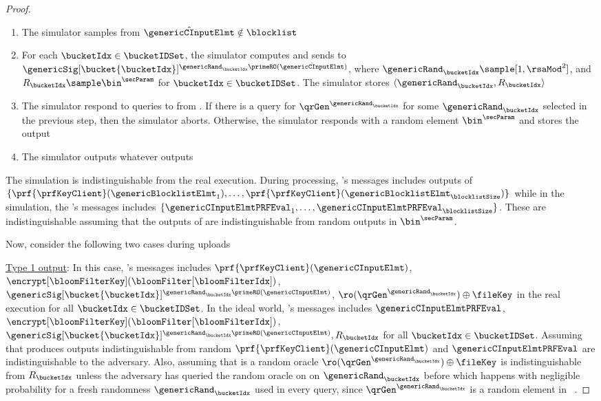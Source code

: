 \begin{proof}
\begin{itemize}
\begin{enumerate}[resume]
\begin{enumerate}
\item The simulator samples from $\hat{\genericCInputElmt} \notin \blocklist$
\item For each $\bucketIdx \in \bucketIDSet$, the simulator computes and sends to \server $\genericSig[\bucket{\bucketIdx}]^{\genericRand_\bucketIdx \primeRO(\hat{\genericCInputElmt})}$, where $\genericRand_\bucketIdx \sample [1, \rsaMod^2]$, and $R_\bucketIdx \sample \bin^{\secParam}$ for $\bucketIdx \in \bucketIDSet$.  The simulator stores $\langle \genericRand_\bucketIdx, R_\bucketIdx \rangle$
\item The simulator respond to queries to \ro from \server. If there is a query for $\qrGen^{\genericRand_\bucketIdx}$ for some $\genericRand_\bucketIdx$ selected in the previous step, then the simulator aborts. Otherwise, the simulator responds with a random element $\bin^{\secParam}$ and stores the output
\item The simulator outputs whatever \server outputs
\end{enumerate}
\end{enumerate}
\end{itemize}


The simulation is indistinguishable from the real execution. During processing, \server's messages includes outputs of \authOPRFFunc 
$\{ \prf{\prfKeyClient}(\genericBlocklistElmt_1), \dots,   \prf{\prfKeyClient}(\genericBlocklistElmt_\blocklistSize)\}$
while in the simulation, the \server's messages includes $\{ \genericCInputElmtPRFEval_1, \dots, \genericCInputElmtPRFEval_\blocklistSize \}$. These are indistinguishable assuming that the outputs of \prf are indistinguishable from random outputs in $\bin^{\secParam}$. 




Now, consider the following two cases during uploads


\noindent \underline{Type 1 output}: In this case, \server's messages includes $ \prf{\prfKeyClient}(\genericCInputElmt)$, $\encrypt[\bloomFilterKey](\bloomFilter[\bloomFilterIdx])$, $\genericSig[\bucket{\bucketIdx}]^{\genericRand_\bucketIdx \primeRO(\genericCInputElmt)}$, $\ro(\qrGen^{\genericRand_\bucketIdx}) \oplus \fileKey $ in the real execution for all $\bucketIdx \in \bucketIDSet$. In the ideal world, \server's messages includes $\genericCInputElmtPRFEval$, $\encrypt[\bloomFilterKey](\bloomFilter[\bloomFilterIdx])$, $\genericSig[\bucket{\bucketIdx}]^{\genericRand_\bucketIdx \primeRO(\genericCInputElmt)}, R_\bucketIdx$ for all $\bucketIdx \in \bucketIDSet$. Assuming that \prf produces outputs indistinguishable from random  $ \prf{\prfKeyClient}(\genericCInputElmt)$ and $\genericCInputElmtPRFEval$ are indistinguishable to the adversary. Also, assuming that \ro is a random oracle $\ro(\qrGen^{\genericRand_\bucketIdx}) \oplus \fileKey $ is indistinguishable from $R_\bucketIdx$ unless the adversary has queried the random oracle on \ro on $\genericRand_\bucketIdx$ before which happens with negligible probability for a fresh randomness $\genericRand_\bucketIdx$ used in every query, since $\qrGen^{\genericRand_\bucketIdx}$ is a random element in \qrGroup~\cite{cramer2000signature}.  


\end{proof}
